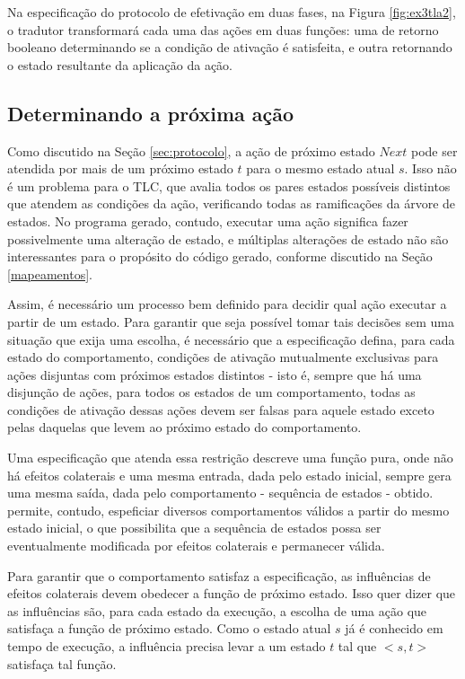 Na especificação do protocolo de efetivação em duas fases, na Figura
\ref{fig:ex3tla2}, o tradutor transformará cada uma das ações em duas funções:
uma de retorno booleano determinando se a condição de ativação é satisfeita, e
outra retornando o estado resultante da aplicação da ação.


\subsection{Determinando a próxima ação}

Como discutido na Seção \ref{sec:protocolo}, a ação de próximo estado $Next$
pode ser atendida por mais de um próximo estado $t$ para o mesmo estado atual $s$.
Isso não é um problema para o TLC, que avalia todos os pares estados possíveis distintos
que atendem as condições da ação, verificando todas as ramificações da árvore de
estados. No programa gerado, contudo, executar uma ação significa fazer possivelmente uma alteração de estado, e
múltiplas alterações de estado não são interessantes para o propósito do
código gerado, conforme discutido na Seção \ref{mapeamentos}.

Assim, é necessário um processo bem definido para decidir qual ação executar a
partir de um estado. Para garantir que seja possível tomar tais decisões sem uma
situação que exija uma escolha, é
necessário que a especificação defina, para cada estado do comportamento, condições de ativação mutualmente
exclusivas para ações disjuntas com próximos estados distintos - isto é,
sempre que há uma disjunção de ações, para todos os estados de um comportamento,
todas as condições de ativação dessas ações devem ser falsas para aquele estado exceto pelas daquelas
que levem ao próximo estado do comportamento.

Uma especificação que atenda essa restrição descreve uma função pura, onde não
há efeitos colaterais e uma mesma entrada, dada pelo estado inicial, sempre gera uma mesma
saída, dada pelo comportamento - sequência de estados - obtido. \TLA permite,
contudo, espeficiar diversos comportamentos válidos a partir do mesmo estado
inicial, o que possibilita que a sequência de estados possa ser eventualmente modificada por
efeitos colaterais e permanecer válida.

Para garantir que o comportamento satisfaz a especificação, as influências de
efeitos colaterais devem obedecer a função de próximo estado. Isso quer dizer
que as influências são, para cada estado da execução, a escolha de uma ação que
satisfaça a função de próximo estado. Como o estado atual $s$ já é conhecido em
tempo de execução, a influência precisa levar a um estado $t$ tal que $<s,t>$
satisfaça tal função.


